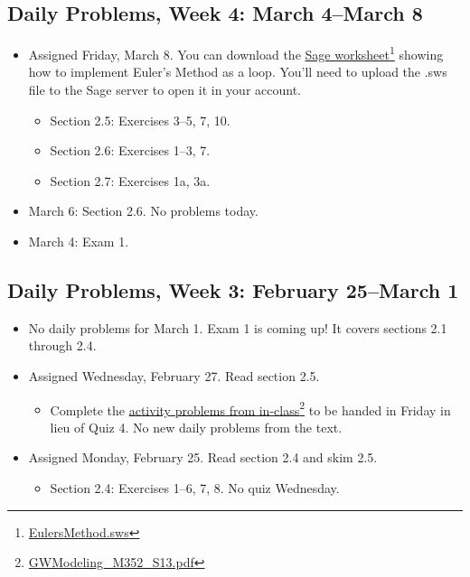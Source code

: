 \subsection{Daily Problems, Week 4: March 4--March 8}
\label{dailyproblemsweek4:march4--march8}

\begin{itemize}
\item Assigned Friday, March 8. You can download the \href{EulersMethod.sws}{Sage worksheet}\footnote{\href{EulersMethod.sws}{EulersMethod.sws}} showing how to implement Euler's Method as a loop. You'll need to upload the .sws file to the Sage server to open it in your account.

\begin{itemize}
\item Section 2.5: Exercises 3--5, 7, 10.

\item Section 2.6: Exercises 1--3, 7.

\item Section 2.7: Exercises 1a, 3a.

\end{itemize}

\item March 6: Section 2.6. No problems today.

\item March 4: Exam 1.

\end{itemize}

\subsection{Daily Problems, Week 3: February 25--March 1}
\label{dailyproblemsweek3:february25--march1}

\begin{itemize}
\item No daily problems for March 1. Exam 1 is coming up! It covers sections 2.1 through 2.4.

\item Assigned Wednesday, February 27. Read section 2.5.

\begin{itemize}
\item Complete the \href{GWModeling_M352_S13.pdf}{activity problems from in-class}\footnote{\href{GWModeling_M352_S13.pdf}{GWModeling\_M352\_S13.pdf}} to be handed in Friday in lieu of Quiz 4. No new daily problems from the text.

\end{itemize}

\item Assigned Monday, February 25. Read section 2.4 and skim 2.5.

\begin{itemize}
\item Section 2.4: Exercises 1--6, 7, 8. No quiz Wednesday.

\end{itemize}

\end{itemize}

